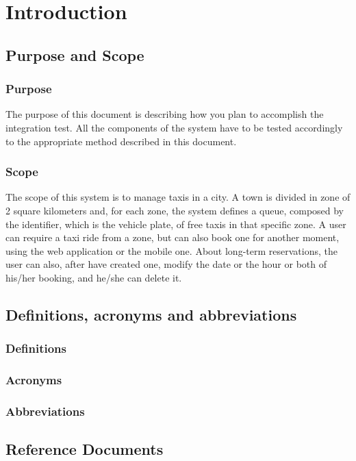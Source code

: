 \section{Introduction}
\subsection{Purpose and Scope}
\subsubsection{Purpose}
	The purpose of this document is describing how you plan to accomplish the integration test. All the components of the system have to be tested accordingly to the appropriate method described in this document.

\subsubsection{Scope}
	The scope of this system is to manage taxis in a city. A town is divided in zone of 2 square kilometers and, for each zone, the system defines a queue, composed by the identifier, which is the vehicle plate, of free taxis in that specific zone. A user can require a taxi ride from a zone, but can also book one for another moment, using the web application or the mobile one. About long-term reservations, the user can also, after have created one, modify the date or the hour or both of his/her booking, and he/she can delete it.
\subsection{Definitions, acronyms and abbreviations}
\subsubsection{Definitions}
\subsubsection{Acronyms}
\subsubsection{Abbreviations}
\subsection{Reference Documents}
	